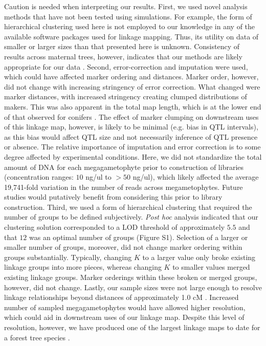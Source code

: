\documentclass[smallextended]{svjour3}
\begin{document}
Caution is needed when interpreting our results. First, we used novel analysis
methods that have not been tested using simulations. For example, the form of
hierarchical clustering used here is not employed to our knowledge in any of the
available software packages used for linkage mapping. Thus, its utility on data
of smaller or larger sizes than that presented here is unknown. Consistency of
results across maternal trees, however, indicates that our methods are likely
appropriate for our data \citep[see also][]{Tani:2003}. Second, error-correction
and imputation were used, which could have affected marker ordering and
distances. Marker order, however, did not change with increasing stringency of
error correction. What changed were marker distances, with increased stringency
creating clumped distributions of makers. This was also apparent in the total
map length, which is at the lower end of that observed for conifers
\citep[cf.,][]{Ritland:2011}. The effect of marker clumping on downstream uses
of this linkage map, however, is likely to be minimal (e.g. bias in QTL
intervals), as this bias would affect QTL size and not necessarily inference of
QTL presence or absence. The relative importance of imputation and error
correction is to some degree affected by experimental conditions. Here, we did
not standardize the total amount of DNA for each megagametophyte prior to
construction of libraries (concentration ranges: $10$ ng/ul to $>50$ ng/ul),
which likely affected the average 19,741-fold variation in the number of reads
across megametophytes. Future studies would putatively benefit from considering
this prior to library construction. Third, we used a form of hierarchical
clustering that required the number of groups to be defined
subjectively. \textit{Post hoc} analysis indicated that our clustering solution
corresponded to a LOD threshold of approximately $5.5$ and that $12$ was an
optimal number of groups (Figure S1). Selection of a larger or smaller number of
groups, moreover, did not change marker ordering within groups substantially.
Typically, changing $K$ to a larger value only broke existing linkage groups
into more pieces, whereas changing $K$ to smaller values merged existing linkage
groups. Marker orderings within these broken or merged groups, however, did not
change.  Lastly, our sample sizes were not large enough to resolve linkage
relationships beyond distances of approximately 1.0 cM \citep[but
see][]{Neves:2014}. Increased number of sampled megagametophytes would have
allowed higher resolution, which could aid in downstream uses of our linkage
map. Despite this level of resolution, however, we have produced one of the
largest linkage maps to date for a forest tree species \citep{Eckert:2010b,
  Martinez-Garcia:2013, Neves:2014}.
\end{document}

